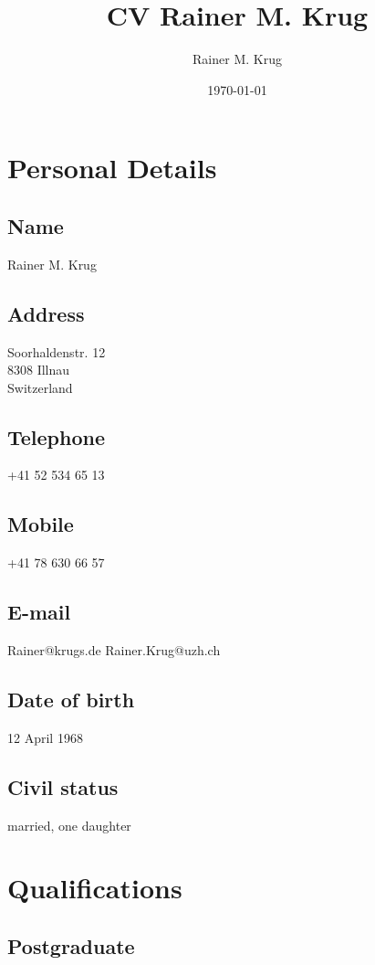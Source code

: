 \documentclass[a4paper]{article}
\author{Rainer M. Krug}
\date{\today}
\title{CV Rainer M. Krug}
\begin{document}
\maketitle




\section{Personal Details}

\subsection{Name}

Rainer M. Krug
\subsection{Address}

Soorhaldenstr. 12 \\
8308 Illnau \\
Switzerland
\subsection{Telephone}

+41 52 534 65 13
\subsection{Mobile}

+41 78 630 66 57
\subsection{E-mail}

Rainer@krugs.de
Rainer.Krug@uzh.ch
\subsection{Date of birth}

12 April 1968
\subsection{Civil status}

married, one daughter

\section{Qualifications}

\subsection{Postgraduate}
\end{document}
